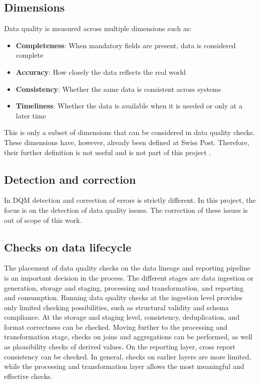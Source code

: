 \subsection*{Dimensions}
Data quality is measured across multiple dimensions such as:
\begin{itemize}
    \item \textbf{Completeness}: When mandatory fields are present, data is considered complete
    \item \textbf{Accuracy}: How closely the data reflects the real world
    \item \textbf{Consistency}: Whether the same data is consistent across systems
    \item \textbf{Timeliness}: Whether the data is available when it is needed or only at a later time
\end{itemize}
This is only a subset of dimensions that can be considered in data quality checks. These dimensions have, however, already been defined at Swiss Post. Therefore, their further definition is not useful and is not part of this project \cite{iso_iec_25012}.

\subsection*{Detection and correction}
In \gls{DQM} detection and correction of errors is strictly different. In this project, the focus is on the detection of data quality issues. The correction of these issues is out of scope of this work.

\subsection*{Checks on data lifecycle}
\label{ResearchDataQChecksOnDataLifecycle}
The placement of data quality checks on the data lineage and reporting pipeline is an important decision in the process. The different stages are data ingestion or generation, storage and staging, processing and transformation, and reporting and consumption. Running data quality checks at the ingestion level provides only limited checking possibilities, such as structural validity and schema compliance. At the storage and staging level, consistency, deduplication, and format correctness can be checked. Moving further to the processing and transformation stage, checks on joins and aggregations can be performed, as well as plausibility checks of derived values. On the reporting layer, cross report consistency can be checked. In general, checks on earlier layers are more limited, while the processing and transformation layer allows the most meaningful and effective checks.



